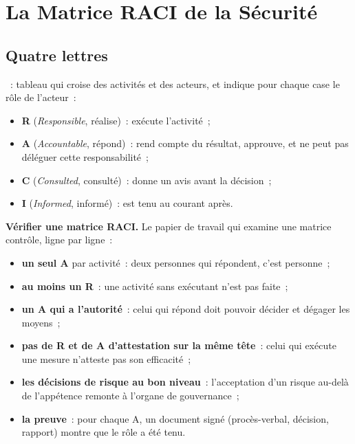 \section{La Matrice RACI de la Sécurité}
\label{sec:c01-raci}

\subsection{Quatre lettres}

\begin{boxdef}
~: tableau qui croise des
activités et des acteurs, et indique pour chaque case le rôle de l'acteur~:
\begin{itemize}
    \item \textbf{R} (\emph{Responsible}, réalise)~: exécute l'activité~;
    \item \textbf{A} (\emph{Accountable}, répond)~: rend compte du résultat,
          approuve, et ne peut pas déléguer cette responsabilité~;
    \item \textbf{C} (\emph{Consulted}, consulté)~: donne un avis avant la
          décision~;
    \item \textbf{I} (\emph{Informed}, informé)~: est tenu au courant après.
\end{itemize}
\end{boxdef}

\begin{boxprocedure}
\textbf{Vérifier une matrice RACI.} Le papier de travail qui examine une
matrice contrôle, ligne par ligne~:
\begin{itemize}
    \item \textbf{un seul A} par activité~: deux personnes qui répondent,
          c'est personne~;
    \item \textbf{au moins un R}~: une activité sans exécutant n'est pas
          faite~;
    \item \textbf{un A qui a l'autorité}~: celui qui répond doit pouvoir
          décider et dégager les moyens~;
    \item \textbf{pas de R et de A d'attestation sur la même tête}~: celui
          qui exécute une mesure n'atteste pas son efficacité~;
    \item \textbf{les décisions de risque au bon niveau}~: l'acceptation
          d'un risque au-delà de l'appétence remonte à l'organe de
          gouvernance~;
    \item \textbf{la preuve}~: pour chaque A, un document signé (procès-verbal,
          décision, rapport) montre que le rôle a été tenu.
\end{itemize}
\end{boxprocedure}


